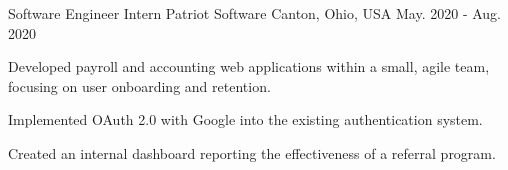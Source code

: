 \begin{cventries}
  \cventry
    {Software Engineer Intern} %
    {Patriot Software} %
    {Canton, Ohio, USA} %
    {May. 2020 - Aug. 2020} %
    {
      \begin{cvitems} %
        \item {Developed payroll and accounting web applications within a small, agile team, focusing on user onboarding and retention.}
        \item {Implemented OAuth 2.0 with Google into the existing authentication system.}
        \item {Created an internal dashboard reporting the effectiveness of a referral program.}
      \end{cvitems}
    }


\end{cventries}
